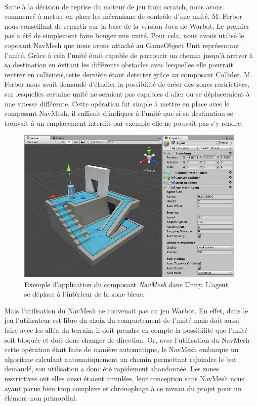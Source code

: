 \documentclass{report}
\begin{document}
\paragraph{}Suite à la décision de reprise du moteur de jeu from scratch, nous avons commencé à mettre en place les mécanisme de contrôle d'une unité, M. Ferber nous conseillant de repartir sur la base de la version Java de Warbot. Le premier pas a été de simplement faire bouger une unité. Pour cela, nous avons utilisé le coposant NavMesh que nous avons attaché au GameObject Unit représentant l'unité. Grâce à cela l'unité était capable de parcourir un chemin jusqu'à arriver à sa destination en évitant les différents obstacles avec lesquelles elle pourrait rentrer en collisions,cette dernière étant detecter grâce au composant Collider. M. Ferber nous avait demandé d'étudier la possibilité de créer des zones restrictives, sur lesquelles certaine unité ne seraient pas capables d'aller ou se déplaceraient à une vitesse différente. Cette opération fut simple à mettre en place avec le composant NavMesh, il suffisait d'indiquer à l'unité que si sa destination se trouvait à un emplacement interdit par exemple elle ne pouvait pas s'y rendre. 
\begin{figure}[h]
\centering
\includegraphics[scale=0.6]{NavMeshImage}
\caption{Exemple d'application du composant \textit{NavMesh} dans Unity. L'agent se déplace à l'intérieur de la zone bleue.}
\end{figure}

Mais l'utilisation du NavMesh  ne convenait pas au jeu Warbot. En effet, dans le jeu l'utilisateur est libre du choix du comportement de l'unité mais doit aussi faire avec les alléa du terrain, il doit prendre en compte la possibilité que l'unité soit bloquée et doit donc changer de direction. Or, avec l'utilisation du NavMesh cette opération était faite de manière automatique, le NavMesh embarque un algoritme calculant automatiquement un chemin permettant rejoindre le but demandé, son utilisation a donc été rapidement abandonnée. Les zones restrictives ont elles aussi étaient annulées, leur conception sans NavMesh nous ayant parue bien trop complexe et chronophage à ce niveau du projet pour un élément non primordial. 
\end{document}
